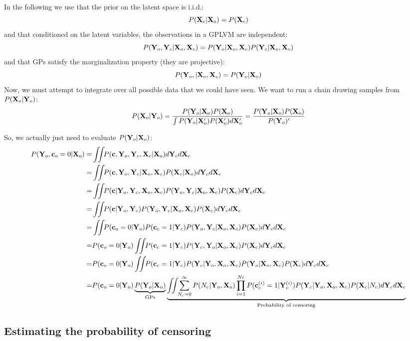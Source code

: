 \documentclass{article}
\begin{document}
\newcommand{\intlatent}{\int \!\!\!  \int \!\! }

In the following we use that the prior on the latent space is i.i.d.: $$P( \mathbf{X}_c | \mathbf{X}_o ) = P( \mathbf{X}_c )$$ 
and that conditioned on the latent variables, the observations in a GPLVM are independent:
$$ P( \mathbf{Y}_o, \mathbf{Y}_c | \mathbf{X}_o, \mathbf{X}_c ) = P( \mathbf{Y}_o | \mathbf{X}_o, \mathbf{X}_c ) P( \mathbf{Y}_c | \mathbf{X}_o, \mathbf{X}_c )$$ 
and that GPs satisfy the marginalization property (they are projective):
$$ P( \mathbf{Y}_o, | \mathbf{X}_o, \mathbf{X}_c ) = P( \mathbf{Y}_o | \mathbf{X}_o ) $$
%
Now, we must attempt to integrate over all possible data that we could have seen.  We want to run a chain drawing samples from $P(\mathbf{X}_o | \mathbf{Y}_o )$:
%
\begin{align}
P(\mathbf{X}_o | \mathbf{Y}_o ) = \frac{P(\mathbf{Y}_o | \mathbf{X}_o ) P(\mathbf{X}_o )}{\int P(\mathbf{Y}_o | \mathbf{X}_o' ) P(\mathbf{X}_o' ) d\mathbf{X}_o'}
= \frac{P(\mathbf{Y}_o | \mathbf{X}_o ) P(\mathbf{X}_o )}{P(\mathbf{Y}_o )'}
\end{align}

So, we actually just need to evaluate $P(\mathbf{Y}_o | \mathbf{X}_o )$:
%
\begin{align}
P(\vY_o, \vc_o = 0 | \vX_o) = & \intlatent P( \vc, \vY_o, \vY_c, \vX_c | \vX_o ) d\vY_c d\vX_c \\
= & \intlatent P( \vc, \vY_o, \vY_c | \vX_o, \vX_c ) P( \vX_c | \vX_o ) d\vY_c d\vX_c \\
= & \intlatent P( \vc | \vY_o, \vY_c, \vX_o, \vX_c ) P( \vY_o, \vY_c | \vX_o, \vX_c ) P( \vX_c ) d\vY_c d\vX_c\\
= & \intlatent P( \vc | \vY_o, \vY_c) P( \vY_o, \vY_c | \vX_o, \vX_c ) P( \vX_c ) d\vY_c d\vX_c \\
= & \intlatent P( \vc_o = 0 | \vY_o ) P( \vc_c = 1 | \vY_c ) P( \vY_o, \vY_c | \vX_o, \vX_c )  P( \vX_c ) d\vY_c d\vX_c\\
= & P( \vc_o = 0 | \vY_o ) \intlatent P( \vc_c = 1 | \vY_c ) P( \vY_c, \vY_o | \vX_o, \vX_c ) P( \vX_c ) d\vY_c d\vX_c \\
= & P( \vc_o = 0 | \vY_o ) \intlatent P( \vc_c = 1 | \vY_c ) P( \vY_c | \vY_o, \vX_o, \vX_c ) P( \vY_o | \vX_o, \vX_c ) P( \vX_c ) d\vY_c d\vX_c \\
= & P( \vc_o = 0 | \vY_o ) \underbrace{P( \vY_o | \vX_o )}_{\textrm{GPs}} \underbrace{ \intlatent \sum_{N_c = 0}^\infty P(N_c | \vY_o, \vX_o ) \prod_{i=1}^{Nc} P( \vc_c^{(i)} = 1 | \vY_c^{(i)} ) P( \vY_c | \vY_o, \vX_o, \vX_c) P(\vX_c | N_c ) d\vY_c d\vX_c }_{\textrm{Probability of censoring}}
\label{eqn:full_censoring_likelihood}
\end{align}

\subsection{Estimating the probability of censoring}
\end{document}
